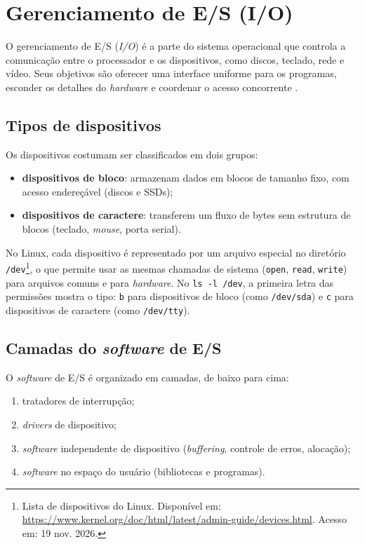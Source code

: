 \chapter{Gerenciamento de E/S (I/O)}\label{cap:io}

O gerenciamento de E/S (\textit{I/O}) é a parte do sistema operacional que controla a
comunicação entre o processador e os dispositivos, como discos, teclado, rede e vídeo. Seus
objetivos são oferecer uma interface uniforme para os programas, esconder os detalhes do
\textit{hardware} e coordenar o acesso concorrente \cite{tanenbaum2016}.

\section{Tipos de dispositivos}\label{sec:tipos-dispositivos}

Os dispositivos costumam ser classificados em dois grupos:

\begin{itemize}
    \item \textbf{dispositivos de bloco}: armazenam dados em blocos de tamanho fixo, com
    acesso endereçável (discos e SSDs);
    \item \textbf{dispositivos de caractere}: transferem um fluxo de bytes sem estrutura de
    blocos (teclado, \textit{mouse}, porta serial).
\end{itemize}

No Linux, cada dispositivo é representado por um arquivo especial no diretório
\texttt{/dev}\footnote{Lista de dispositivos do Linux. Disponível em:
\url{https://www.kernel.org/doc/html/latest/admin-guide/devices.html}. Acesso em: 19 nov.
2026.}, o que permite usar as mesmas chamadas de sistema (\texttt{open}, \texttt{read},
\texttt{write}) para arquivos comuns e para \textit{hardware}. No \texttt{ls -l /dev}, a primeira
letra das permissões mostra o tipo: \texttt{b} para dispositivos de bloco (como
\texttt{/dev/sda}) e \texttt{c} para dispositivos de caractere (como \texttt{/dev/tty}).

\section{Camadas do \textit{software} de E/S}\label{sec:camadas-es}

O \textit{software} de E/S é organizado em camadas, de baixo para cima:

\begin{enumerate}
    \item tratadores de interrupção;
    \item \textit{drivers} de dispositivo;
    \item \textit{software} independente de dispositivo (\textit{buffering}, controle de erros,
    alocação);
    \item \textit{software} no espaço do usuário (bibliotecas e programas).
\end{enumerate}

